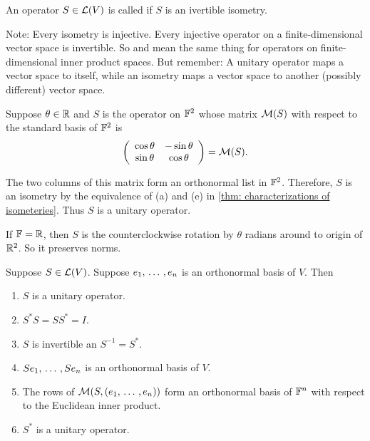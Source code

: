 \begin{mydef}
  An operator $S \in \mathcal{L} (V)$ is called  if $S$ is an ivertible isometry.
\end{mydef}

Note: Every isometry is injective. Every injective operator on a finite-dimensional vector space is invertible. So  and  mean the same thing for operators on finite-dimensional inner product spaces. But remember: A unitary operator maps a vector space to itself, while an isometry maps a vector space to another (possibly different) vector space.

\begin{example}
  Suppose $\theta \in \mathbb{R}$ and $S$ is the operator on $\mathbb{F}^2$ whose matrix $\mathcal{M}(S)$ with respect to the standard basis of $\mathbb{F}^2$ is
  \[
    \left(\begin{array}{cc}
      \cos \theta & - \sin \theta \\
      \sin \theta & \cos \theta
    \end{array} \right)
    = \mathcal{M}(S).
  \]

  The two columns of this matrix form an orthonormal list in $\mathbb{F}^2$. Therefore, $S$ is an isometry by the equivalence of (a) and (e) in \ref{thm: characterizations of isometeries}. Thus $S$ is a unitary operator.

  If $\mathbb{F}=\mathbb{R}$, then $S$ is the counterclockwise rotation by $\theta$ radians around to origin of $\mathbb{R}^2$. So it preserves norms.
\end{example}

\begin{thm}
  \label{thm: characterizations of unitary operators}
  Suppose $S \in \mathcal{L}(V)$. Suppose $e_1, {\, \ldots \,\,}, e_n$ is an orthonormal basis of $V$. Then
  \begin{enumerate}[label=\textbf{(\alph*)}]
    \item $S$ is a unitary operator.
    \item $S^*S = SS^* = I$.
    \item $S$ is invertible an $S^{-1} = S^*$.
    \item $Se_1, {\, \ldots \,\,}, Se_n$ is an orthonormal basis of $V$.
    \item The rows of $\mathcal{M}(S,(e_1, {\, \ldots \,\,}, e_n))$ form an orthonormal basis of $\mathbb{F}^n$ with respect to the Euclidean inner product.
    \item $S^*$ is a unitary operator.
  \end{enumerate}
\end{thm}

